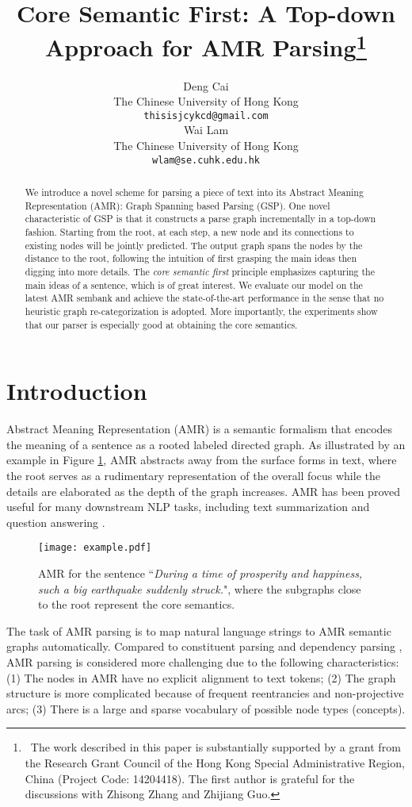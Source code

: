 \documentclass[11pt,a4paper]{article}
\title{Core Semantic First: A Top-down Approach for AMR Parsing\thanks{~The work described in this paper is substantially supported by a grant from the Research Grant Council of the Hong Kong Special Administrative Region, China (Project Code: 14204418). The first author is grateful for the discussions with Zhisong Zhang and Zhijiang Guo.}}
\author{Deng Cai \\
	The Chinese University of Hong Kong\\
	{\tt thisisjcykcd@gmail.com} \\\And
	Wai Lam \\
	The Chinese University of Hong Kong\\
	{\tt wlam@se.cuhk.edu.hk} \\}
\date{}
\begin{document}
	\maketitle
	\begin{abstract}
		We introduce a novel scheme for parsing a piece of text into its Abstract Meaning Representation (AMR): Graph Spanning based Parsing (GSP). One novel characteristic of GSP is that it constructs a parse graph incrementally in a top-down fashion. Starting from the root, at each step, a new node and its connections to existing nodes will be jointly predicted. The output graph spans the nodes by the distance to the root, following the intuition of first grasping the main ideas then digging into more details. The \textit{core semantic first} principle emphasizes capturing the main ideas of a sentence, which is of great interest. We evaluate our model on the latest AMR sembank and achieve the state-of-the-art performance in the sense that no heuristic graph re-categorization is adopted. More importantly, the experiments show that our parser is especially good at obtaining the core semantics.
	\end{abstract}
	\section{Introduction}
	\label{intro}
	Abstract Meaning Representation (AMR) \cite{banarescu2013abstract} is a semantic formalism that encodes the meaning of a sentence as a rooted labeled directed graph. As illustrated by an example in Figure \ref{example},  AMR abstracts away from the surface forms in text, where the root serves as a rudimentary representation of the overall focus while the details are elaborated as the depth of the graph increases. AMR has been proved useful for many downstream NLP tasks, including text summarization \cite{liu-etal-2015-toward,hardy-vlachos-2018-guided} and question answering \cite{mitra2016addressing}.
	\begin{figure}[t]
		\centering
		\texttt{[image: example.pdf]}
		\caption{AMR for the sentence ``\textit{During a time of prosperity and happiness, such a big earthquake suddenly struck.}", where the subgraphs close to the root represent the core semantics.}
		\label{example}
	\end{figure} 
	
	The task of AMR parsing is to map natural language strings to AMR semantic graphs automatically. Compared to constituent parsing \cite{zhang2009transition} and dependency parsing \cite{kubler2009dependency}, AMR parsing is considered more challenging due to the following characteristics: (1) The nodes in AMR have no explicit alignment to text tokens; (2) The graph structure is more complicated because of frequent reentrancies and non-projective arcs; (3) There is a large and sparse vocabulary of possible node types (concepts).
	
\end{document}
